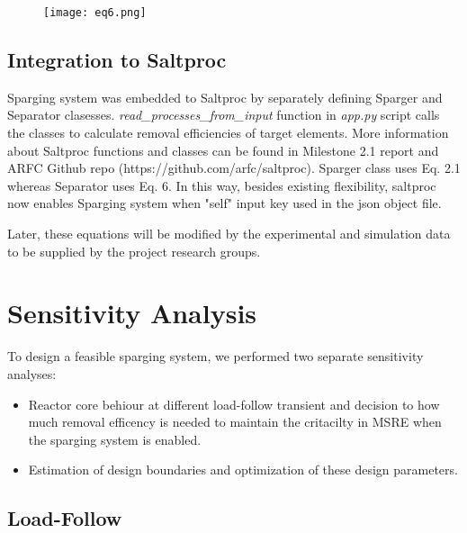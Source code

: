     \begin{figure}[htbp!]
        \begin{center}
            \texttt{[image: eq6.png]}
        \end{center}
        \label{fig:eq6}
    \end{figure}

\newpage
\FloatBarrier

\subsection{Integration to Saltproc}

    Sparging system was embedded to Saltproc by separately defining Sparger and Separator clasesses. \textit{read\_processes\_from\_input} function in \textit{app.py} script calls the classes to calculate removal efficiencies of target elements. More information about Saltproc functions and classes can be found in Milestone 2.1 report \cite{rykhlevskii_milestone_2019} and ARFC Github repo (https://github.com/arfc/saltproc). Sparger class uses Eq. 2.1 whereas Separator uses Eq. 6. In this way, besides existing flexibility, saltproc now enables Sparging system when "self" input key used in the json object file.

    Later, these equations will be modified by the experimental and simulation data to be supplied by the project research groups.

\newpage
\FloatBarrier

\section{Sensitivity Analysis}

    To design a feasible sparging system, we performed two separate sensitivity analyses:

    \begin{itemize}
        \item Reactor core behiour at different load-follow transient and decision to how much removal efficency is needed to maintain the critacilty in MSRE when the sparging system is enabled.
        \item Estimation of design boundaries and optimization of these design parameters.
    \end{itemize}

\subsection{Load-Follow}

